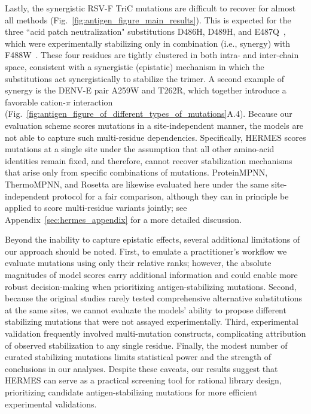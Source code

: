 Lastly, the synergistic RSV-F TriC mutations are difficult to recover for almost all methods
(Fig.~\ref{fig:antigen_figure_main_results}). This is expected for the three ``acid patch
neutralization" substitutions D486H, D489H, and E487Q~\citep{mclellan_structure-based_2013}, which
were experimentally stabilizing only in combination (i.e., synergy) with
F488W~\citep{mclellan_structure-based_2013}. These four residues are tightly clustered in both
intra- and inter-chain space, consistent with a synergistic (epistatic) mechanism in which the
substitutions act synergistically to stabilize the trimer. A second example of synergy is the DENV-E
pair A259W and T262R, which together introduce a favorable cation-$\pi$ interaction
(Fig.~\ref{fig:antigen_figure_of_different_types_of_mutations}A.4). Because our evaluation scheme
scores mutations in a site-independent manner, the models are not able to capture such multi-residue
dependencies. Specifically, HERMES scores mutations at a single site under the assumption that all
other amino-acid identities remain fixed, and therefore, cannot recover stabilization mechanisms
that arise only from specific combinations of mutations. ProteinMPNN, ThermoMPNN, and Rosetta are
likewise evaluated here under the same site-independent protocol for a fair comparison, although
they can in principle be applied to score multi-residue variants jointly; see Appendix~\ref{sec:hermes_appendix} for a more
detailed discussion.

Beyond the inability to capture epistatic effects, several additional limitations of our approach
should be noted. First, to emulate a practitioner's workflow we evaluate mutations using only their
relative ranks; however, the absolute magnitudes of model scores carry additional information and
could enable more robust decision-making when prioritizing antigen-stabilizing mutations. Second,
because the original studies rarely tested comprehensive alternative substitutions at the same
sites, we cannot evaluate the models' ability to propose different stabilizing mutations that were
not assayed experimentally. Third, experimental validation frequently involved multi-mutation
constructs, complicating attribution of observed stabilization to any single residue. Finally, the
modest number of curated stabilizing mutations limits statistical power and the strength of
conclusions in our analyses. Despite these caveats, our results suggest that HERMES can serve as a
practical screening tool for rational library design, prioritizing candidate antigen-stabilizing
mutations for more efficient experimental validations.

